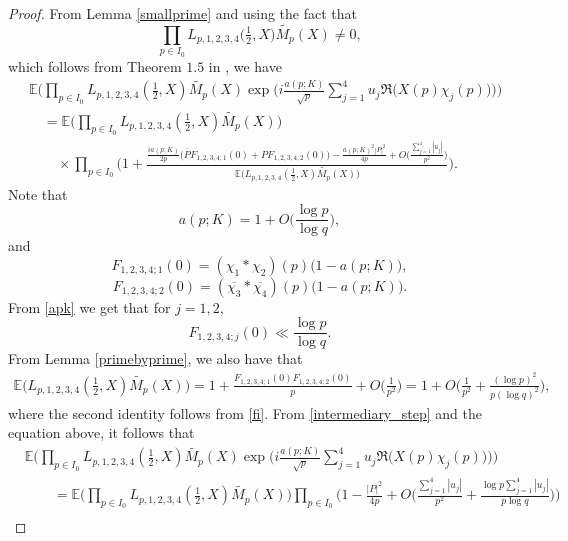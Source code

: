 \documentclass[12pt, reqno]{amsart}
\newcommand{\E}{\mathbb{E}}
\numberwithin{equation}{section}
\numberwithin{theorem}{section}
\numberwithin{equation}{section}
\begin{document}
  \begin{proof}
   From Lemma \ref{smallprime} and using the fact that
   $$  \prod_{p \in I_0} L_{p,1,2,3,4}\big( \tfrac{1}{2},X) \widetilde{M_p}(X) \neq 0,$$
 which follows from Theorem $1.5$ in \cite{BFM}, we have  
\begin{align}\label{intermediary_step}
&\E \Bigg( \prod_{p \in I_0} L_{p,1,2,3,4}( \tfrac{1}{2},X) \widetilde{M_p}(X) \exp \bigg(  i \frac{a(p;K)}{
    \sqrt{p}}\sum_{j=1}^4   u_j \Re \big(X(p) \chi_j(p)\big)\bigg) \Bigg)\nonumber\\
    &\quad= \E \Bigg( \prod_{p \in I_0} L_{p,1,2,3,4}( \tfrac{1}{2},X) \widetilde{M_p}(X) \Bigg)  \\
    &\qquad \times  \prod_{p \in I_0} \Bigg( 1 + \frac{ \frac{ i a(p;K)}{2p} \big( \overline{P} F_{1,2,3,4;1}(0)+ P F_{1,2,3,4;2}(0) \big) - \frac{a(p;K)^2 |P|^2}{4p} +  O \big(  \frac{\sum_{j=1}^4 |u_j|}{p^{2}}\big)}{  \E \Big( L_{p,1,2,3,4}( \frac{1}{2},X) \widetilde{M_p}(X)\Big) } \Bigg).\nonumber  
    \end{align}
 Note that 
   \begin{equation}
       a(p;K) = 1 + O \Big( \frac{ \log p}{\log q} \Big), \label{apk}
        \end{equation} and
   $$F_{1,2,3,4;1}(0) = (\chi_1*\chi_2)(p) \big(1-a(p;K)\big),$$
   $$F_{1,2,3,4;2}(0) = (\overline{\chi_3}*\overline{\chi_4})(p) \big(1-a(p;K)\big).$$
   From \eqref{apk} we get that for $j=1,2$,
   \begin{equation}
   \label{fi} F_{1,2,3,4;j}(0) \ll \frac{ \log p}{\log q}.
   \end{equation}
From Lemma \ref{primebyprime}, we also have that 
\begin{align*}
    \E \Big( L_{p,1,2,3,4}( \tfrac{1}{2},X) \widetilde{M_p}(X) \Big) = 1+ \frac{F_{1,2,3,4;1}(0) F_{1,2,3,4;2}(0)}{p}+ O \Big( \frac{1}{p^2}\Big) = 1+ O \Big( \frac{1}{p^2} + \frac{ (\log p)^2}{p (\log q)^2} \Big),
\end{align*}
where the second identity follows from \eqref{fi}. 
From \eqref{intermediary_step} and the equation above, it follows that 
\begin{align*}
&\E \Bigg( \prod_{p \in I_0} L_{p,1,2,3,4}( \tfrac{1}{2},X) \widetilde{M_p}(X) \exp \bigg(  i \frac{a(p;K)}{
    \sqrt{p}}\sum_{j=1}^4   u_j \Re \big(X(p) \chi_j(p)\big)\bigg) \Bigg)\\ 
    &\qquad = \E \Bigg( \prod_{p \in I_0} L_{p,1,2,3,4}( \tfrac{1}{2},X) \widetilde{M_p}(X) \Bigg) \prod_{p \in I_0} \bigg(  1 - \frac{|P|^2}{4p} + O \Big(\frac{\sum_{j=1}^4 |u_j|}{p^2}+  \frac{ \log p\sum_{j=1}^4 |u_j| }{p \log q} \Big)\bigg)\\

\end{align*}
\end{proof}
\end{document}
